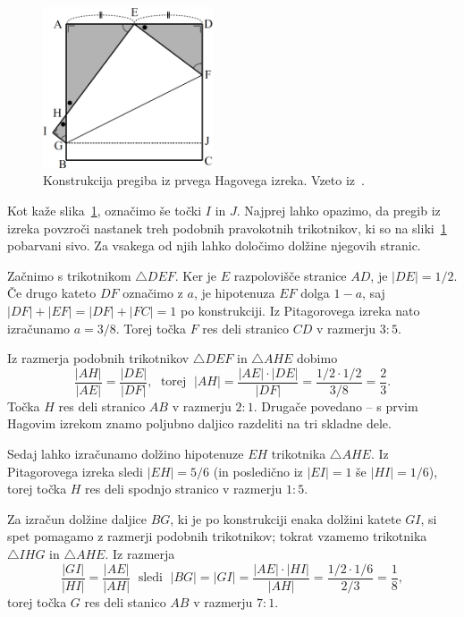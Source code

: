 \begin{figure}[h]
    \centering
    \includegraphics[width=0.45\textwidth]{images/hagovi_izreki/hagov_izrek1.png}
    \caption[Pregib iz prvega Hagovega izreka]{Konstrukcija pregiba iz prvega Hagovega izreka. Vzeto iz~\cite[str. 4]{haga2008}.}
    \label{fig:hagov_izrek1}
\end{figure}

\begin{dokaz}
    Kot kaže slika~\ref{fig:hagov_izrek1}, označimo še točki $I$ in $J$. Najprej lahko opazimo, da pregib iz izreka povzroči nastanek treh podobnih pravokotnih trikotnikov, ki so na sliki~\ref{fig:hagov_izrek1} pobarvani sivo. Za vsakega od njih lahko določimo dolžine njegovih stranic.

    Začnimo s trikotnikom $\triangle DEF$. Ker je $E$ razpolovišče stranice $AD$, je $|DE| = 1/2$. Če drugo kateto $DF$ označimo z $a$, je hipotenuza $EF$ dolga $1-a$, saj $|DF| + |EF| = |DF| + |FC| = 1$ po konstrukciji. Iz Pitagorovega izreka nato izračunamo $a = 3/8$. Torej točka $F$ res deli stranico $CD$ v razmerju $3:5$.

    Iz razmerja podobnih trikotnikov $\triangle DEF$ in $\triangle AHE$ dobimo
    $$ \frac{|AH|}{|AE|} = \frac{|DE|}{|DF|}, \; \text{ torej } \; |AH| = \frac{|AE|\cdot|DE|}{|DF|} = \frac{1/2 \cdot 1/2}{3/8} = \frac{2}{3}.$$
    Točka $H$ res deli stranico $AB$ v razmerju $2:1$. Drugače povedano -- s prvim Hagovim izrekom znamo poljubno daljico razdeliti na tri skladne dele.

    Sedaj lahko izračunamo dolžino hipotenuze $EH$ trikotnika $\triangle AHE$. Iz Pitagorovega izreka sledi $|EH| = 5/6$ (in posledično iz $|EI| = 1$ še $|HI| = 1/6$), torej točka $H$ res deli spodnjo stranico v razmerju $1:5$.

    Za izračun dolžine daljice $BG$, ki je po konstrukciji enaka dolžini katete $GI$, si spet pomagamo z razmerji podobnih trikotnikov; tokrat vzamemo trikotnika $\triangle IHG$ in $\triangle AHE$. Iz razmerja
    $$ \frac{|GI|}{|HI|} = \frac{|AE|}{|AH|} \; \text{ sledi } \; |BG| = |GI| = \frac{|AE|\cdot|HI|}{|AH|} = \frac{1/2 \cdot 1/6}{2/3} = \frac{1}{8},$$
    torej točka $G$ res deli stanico $AB$ v razmerju $7:1$.
\end{dokaz}


